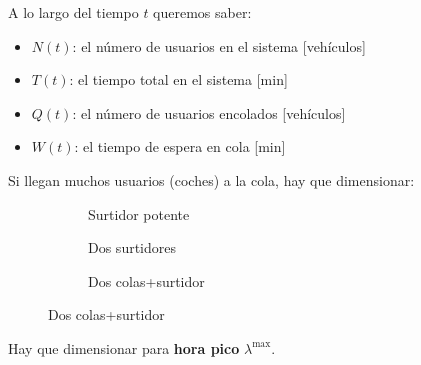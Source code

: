 \documentclass{beamer}
\begin{document}
\begin{frame}{\secname}
    

    \begin{figure}
        
    \end{figure}
    A lo largo del tiempo $t$ queremos saber:

    \begin{itemize}
        \item $N(t)$: el número de usuarios
            en el sistema [vehículos]
        \item $T(t)$: el tiempo total en
            el sistema
            [min]
        \item $Q(t)$: el número de usuarios
            encolados [vehículos]
        \item $W(t)$: el tiempo de espera
            en cola [min]
    \end{itemize}
\end{frame}









\begin{frame}{\secname}
    Si llegan muchos usuarios (coches)
    a la cola, hay que dimensionar:


    \begin{figure}
     \centering
     \begin{subfigure}[b]{0.3\textwidth}
         \centering
         \resizebox{\textwidth}{!}{%
         }
         \caption{Surtidor potente}
     \end{subfigure}
     \hfill
     \begin{subfigure}[b]{0.3\textwidth}
         \centering
         \resizebox{\textwidth}{!}{%
         }
         \caption{Dos surtidores}
     \end{subfigure}
     \hfill
     \begin{subfigure}[b]{0.3\textwidth}
         \centering
         \resizebox{\textwidth}{!}{%
         }
         \caption{Dos colas+surtidor}
     \end{subfigure}
    \end{figure}

\end{frame}



\begin{frame}{\secname}
    Hay que dimensionar para \textbf{hora pico}
    $\lambda^{\max}$.

    \vfill

    \begin{figure}
        
    \end{figure}
\end{frame}
\end{document}
